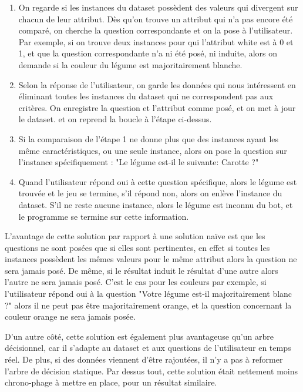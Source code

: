 \documentclass{report}
\begin{document}
\begin{enumerate}
    \item On regarde si les instances du dataset possèdent des valeurs qui divergent sur chacun de leur attribut. Dès qu'on trouve un attribut qui n'a pas encore été comparé, on cherche la question correspondante et on la pose à l'utilisateur.
    Par exemple, si on trouve deux instances pour qui l'attribut white est à 0 et 1, et que la question correspondante n'a ni été posé, ni induite, alors on demande si la couleur du légume est majoritairement blanche.
    \item Selon la réponse de l'utilisateur, on garde les données qui nous intéressent en éliminant toutes les instances du dataset qui ne correspondent pas aux critères. On enregistre la question et l'attribut comme posé, et on met à jour le dataset. et on reprend la boucle à l'étape ci-dessus.
    \item Si la comparaison de l'étape 1 ne donne plus que des instances ayant les même caractéristiques, ou une seule instance, alors on pose la question sur l'instance spécifiquement : "Le légume est-il le suivante: Carotte ?" 
    \item Quand l'utilisateur répond oui à cette question spécifique, alors le légume est trouvée et le jeu se termine, s'il répond non, alors on enlève l'instance du dataset. S'il ne reste aucune instance, alors le légume est inconnu du bot, et le programme se termine sur cette information.
\end{enumerate}

L'avantage de cette solution par rapport à une solution naïve est que les questions ne sont posées que si elles sont pertinentes, en effet si toutes les instances possèdent les mêmes valeurs pour le même attribut alors la question ne sera jamais posé. De même, si le résultat induit le résultat d'une autre alors l'autre ne sera jamais posé. C'est le cas pour les couleurs par exemple, si l'utilisateur répond oui à la question "Votre légume est-il majoritairement blanc ?" alors il ne peut pas être majoritairement orange, et la question concernant la couleur orange ne sera jamais posée.

D'un autre côté, cette solution est également plus avantageuse qu'un arbre décisionnel, car il s'adapte au dataset et aux questions de l'utilisateur en temps réel. De plus, si des données viennent d'être rajoutées, il n'y a pas à reformer l'arbre de décision statique. Par dessus tout, cette solution était nettement moins chrono-phage à mettre en place, pour un résultat similaire.
\end{document}
